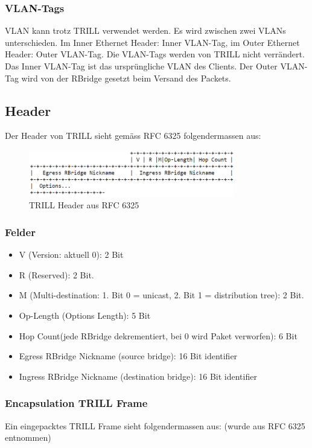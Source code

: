 \documentclass[a4,12pt]{scrartcl}
\begin{document}
\subsubsection{VLAN-Tags}
VLAN kann trotz TRILL verwendet werden. Es wird zwischen zwei VLANs unterschieden. Im Inner Ethernet Header: Inner VLAN-Tag, im Outer Ethernet Header: Outer VLAN-Tag. Die VLAN-Tags werden von TRILL nicht verrändert. Das Inner VLAN-Tag ist das ursprüngliche VLAN des Clients. Der Outer VLAN-Tag wird von der RBridge gesetzt beim Versand des Packets. 

\subsection{Header}
Der Header von TRILL sieht gemäss RFC 6325 folgendermassen aus: 

\begin{figure} [H]
	\begin{center}
	\includegraphics[width=0.80\textwidth]{./pictures/trill_header.png}
	\caption{TRILL Header aus RFC 6325}
	\label{x}
	\end{center}
\end{figure}

\subsubsection{Felder}
\begin{itemize}
\item V (Version: aktuell 0): 2 Bit
\item R (Reserved): 2 Bit.
\item M (Multi-destination: 1. Bit 0 = unicast, 2. Bit 1 = distribution tree): 2 Bit.
\item Op-Length (Options Length): 5 Bit
\item Hop Count(jede RBridge dekrementiert, bei 0 wird Paket verworfen): 6 Bit
\item Egress RBridge Nickname (source bridge): 16 Bit identifier
\item Ingress RBridge Nickname (destination bridge): 16 Bit identifier
\end{itemize}

\subsubsection{Encapsulation TRILL Frame}
Ein eingepacktes TRILL Frame sieht folgendermassen aus: (wurde aus RFC 6325 entnommen) 
\end{document}
